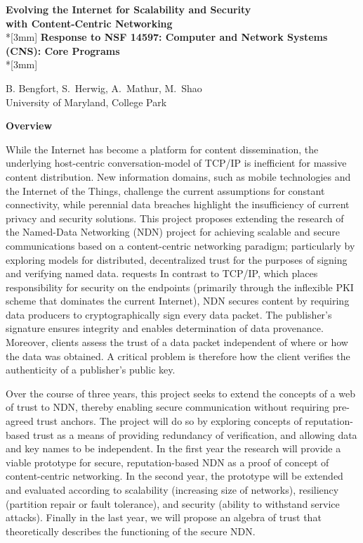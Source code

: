 \documentclass{proposalnsf}
\begin{document}
\begin{center}
{\Large{\bf Evolving the Internet for Scalability and Security \\
with Content-Centric Networking}}\\*[3mm]
{\bf Response to NSF 14597: Computer and Network Systems (CNS): Core Programs} \\*[3mm]

B. Bengfort, S.\ Herwig, A.\ Mathur, M.\ Shao\\
University of Maryland, College Park

\end{center}

\noindent
{\large{\bf Overview}}

\noindent
While the Internet has become a platform for content dissemination, the underlying host-centric conversation-model of TCP/IP is inefficient for massive content distribution. New information domains, such as mobile technologies and the Internet of the Things, challenge the current assumptions for constant connectivity, while perennial data breaches highlight the insufficiency of current privacy and security solutions. This project proposes extending the research of the Named-Data Networking (NDN) project for achieving scalable and secure communications based on a content-centric networking paradigm; particularly by exploring models for distributed, decentralized trust for the purposes of signing and verifying named data.
requests
In contrast to TCP/IP, which places responsibility for security on the endpoints (primarily through the inflexible PKI scheme that dominates the current Internet), NDN secures content by requiring data producers to cryptographically sign every data packet. The publisher's signature ensures integrity and enables determination of data provenance. Moreover, clients assess the trust of a data packet independent of where or how the data was obtained. A critical problem is therefore how the client verifies the authenticity of a publisher's public key.

Over the course of three years, this project seeks to extend the concepts of a web of trust to NDN, thereby enabling secure communication without requiring pre-agreed trust anchors. The project will do so by exploring concepts of reputation-based trust as a means of providing redundancy of verification, and allowing data and key names to be independent. In the first year the research will provide a viable prototype for secure, reputation-based NDN as a proof of concept of content-centric networking. In the second year, the prototype will be extended and evaluated according to scalability (increasing size of networks), resiliency (partition repair or fault tolerance), and security (ability to withstand service attacks). Finally in the last year, we will propose an algebra of trust that theoretically describes the functioning of the secure NDN.
\end{document}
